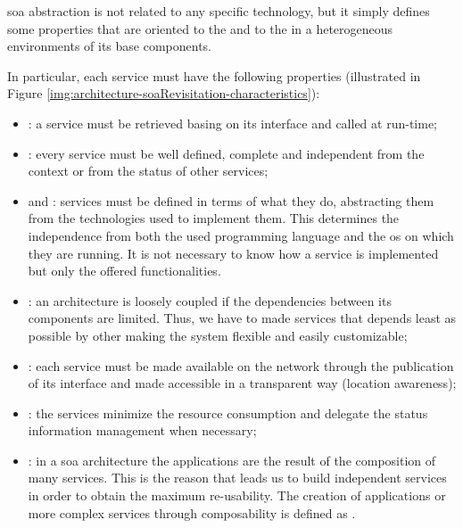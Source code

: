 \ac{soa} abstraction is not related to any specific technology, but it simply defines some properties 
that are oriented to the  and to the  in a heterogeneous environments
of its base components.

In particular, each service must have the following properties (illustrated in Figure 
\ref{img:architecture-soaRevisitation-characteristics}):

\begin{itemize}
	\item{: a service must be retrieved basing on its interface and
		called at run-time;}
	\item{: every service must be well defined, complete and independent
		from the context or from the status of other services;}
	\item{ and : services must
		be defined in terms of what they do, abstracting them from the technologies used to implement
		them. This determines the independence from both the used programming language and the \acs{os}
		on which they are running. It is not necessary to know how a service is implemented but only
		the offered functionalities.}
	\item{: an architecture is loosely coupled if the dependencies
		between its components are limited. Thus, we have to made services that depends least as possible
		by other making the system flexible and easily customizable;}
	\item{: each service must be made available on the network through
		the publication of its interface and made accessible in a transparent way (location awareness);}
	\item{: the services minimize the resource consumption and delegate
		the status information management when necessary;}
	\item{: in a \ac{soa} architecture the applications are the result of
		the composition of many services. This is the reason that leads us to build independent services
		in order to obtain the maximum re-usability. The creation of applications or more complex
		services through composability is defined as .}
\end{itemize}

